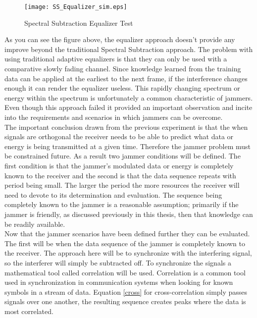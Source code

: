 \begin{figure}[!ht]\label{SS_equalizer}
\centering
\texttt{[image: SS\_Equalizer\_sim.eps]}
\caption{Spectral Subtraction Equalizer Test}
\end{figure} 

As you can see the figure above, the equalizer approach doesn't provide any improve beyond the traditional Spectral Subtraction approach.  The problem with using traditional adaptive equalizers is that they can only be used with a comparative slowly fading channel.  Since knowledge learned from the training data can be applied at the earliest to the next frame, if the interference changes enough it can render the equalizer useless.  This rapidly changing spectrum or energy within the spectrum is unfortunately a common characteristic of jammers.  Even though this approach failed it provided an important observation and incite into the requirements and scenarios in which jammers can be overcome.\\ %



The important conclusion drawn from the previous experiment is that the when signals are orthogonal the receiver needs to be able to predict what data or energy is being transmitted at a given time.  Therefore the jammer problem must be constrained future.  As a result two jammer conditions will be defined.  The first condition is that the jammer's modulated data or energy is completely known to the receiver and the second is that the data sequence repeats with period being small.  The larger the period the more resources the receiver will need to devote to its determination and evaluation.  The sequence being completely known to the jammer is a reasonable assumption; primarily if the jammer is friendly, as discussed previously in this thesis, then that knowledge can be readily available.\\

Now that the jammer scenarios have been defined further they can be evaluated.  The first will be when the data sequence of the jammer is completely known to the receiver.  The approach here will be to synchronize with the interfering signal, so the interferer will simply be subtracted off.  To synchronize the signals a mathematical tool called correlation will be used.  Correlation is a common tool used in synchronization in communication systems when looking for known symbols in a stream of data.  Equation \ref{cross} for cross-correlation simply passes signals over one another, the resulting sequence creates peaks where the data is most correlated.\\

